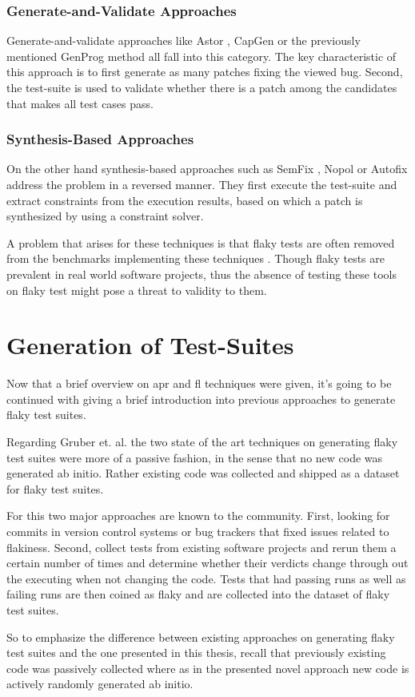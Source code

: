 \documentclass[
fancyheadings, %
%
%
]{stsreprt}
\begin{document}
\subsubsection{Generate-and-Validate Approaches}
Generate-and-validate approaches like Astor \cite{astor:2019}, CapGen \cite{capgen:2018} or the previously mentioned GenProg method all fall into this category. 
The key characteristic of this approach is to first generate as many patches fixing the viewed bug. 
Second, the test-suite is used to validate whether there is a patch among the candidates that makes all test cases pass. 
\subsubsection{Synthesis-Based Approaches}
On the other hand synthesis-based approaches such as SemFix \cite{semfix:2013}, Nopol \cite{nopol:2017} or Autofix \cite{autofix:2014} address the problem in a reversed manner. 
They first execute the test-suite and extract constraints from the execution results, based on which a patch is synthesized by using a constraint solver. \cite{apr-benchmark-quixbugs:2021} \par
A problem that arises for these techniques is that flaky tests are often removed from the benchmarks implementing these techniques \cite{flaky-impact-repair:2021}.
Though flaky tests are prevalent in real world software projects, thus the absence of testing these tools on flaky test might pose a threat to validity to them. 
\section{Generation of Test-Suites}\label{sec:prev_approach}
Now that a brief overview on \acrshort{apr} and \acrshort{fl} techniques were given, it's going to be continued with giving a brief introduction into previous approaches to generate flaky test suites.\par
Regarding Gruber et. al. \cite{empirical-flaky:2021} the two state of the art techniques on generating flaky test suites were more of a passive fashion, in the sense that no new code was generated ab initio. 
Rather existing code was collected and shipped as a dataset for flaky test suites. \par
For this two major approaches are known to the community. 
First, looking for commits in version control systems or bug trackers that fixed issues related to flakiness. 
Second, collect tests from existing software projects and rerun them a certain number of times and determine whether their verdicts change through out the executing when not changing the code. 
Tests that had passing runs as well as failing runs are then coined as flaky and are collected into the dataset of flaky test suites.  \par
So to emphasize the difference between existing approaches on generating flaky test suites and the one presented in this thesis, recall that previously existing code was passively collected where as in the presented novel approach new code is actively randomly generated ab initio. 
\end{document}
